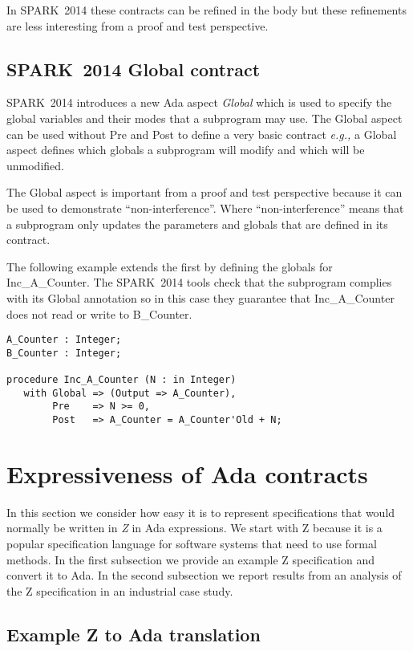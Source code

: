 \documentclass{llncs}
\newcommand{\newspark}{SPARK~2014\xspace}
\newcommand{\ada}{Ada\xspace}
\newcommand{\eg}{\textit{e.g.,}\xspace}
\begin{document}
In \newspark these contracts can be refined in the body but these
refinements are less interesting from a proof and test perspective.

\subsection{\newspark Global contract}

\newspark introduces a new \ada aspect \emph{Global} which is used to
specify the global variables and their modes that a subprogram may
use. The Global aspect can be used without Pre and Post to define a
very basic contract \eg a Global aspect defines which globals a
subprogram will modify and which will be unmodified.

The Global aspect is important from a proof and test perspective
because it can be used to demonstrate ``non-interference''. Where
``non-interference'' means that a subprogram only updates the
parameters and globals that are defined in its contract.

The following example extends the first by defining the globals for
Inc\_A\_Counter. The \newspark tools check that the subprogram
complies with its Global annotation so in this case they guarantee
that Inc\_A\_Counter does not read or write to B\_Counter.

\begin{lstlisting}[language=SPARK]
A_Counter : Integer;
B_Counter : Integer;

procedure Inc_A_Counter (N : in Integer)
   with Global => (Output => A_Counter),
        Pre    => N >= 0,
        Post   => A_Counter = A_Counter'Old + N;
\end{lstlisting}


\section{Expressiveness of Ada contracts}

In this section we consider how easy it is to represent specifications
that would normally be written in \emph{Z} in Ada expressions. We
start with Z because it is a popular specification language for
software systems that need to use formal methods. In the first subsection
we provide an example Z specification and convert it to Ada.
In the second subsection we report results from an analysis of the
Z specification in an industrial case study.

\subsection{Example Z to Ada translation}
\end{document}
